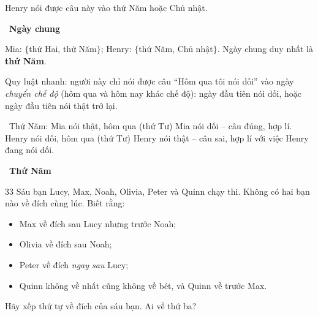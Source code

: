\documentclass[11pt]{article}
\providecommand{\AnsWord}{Đáp số}
\newenvironment{probbox}[2]{\begin{probboxT}{#1}{#2}}{\end{probboxT}}
\newcommand{\ans}[1]{\par\smallskip{\bfseries\color{tmGreen!88!black}\AnsWord:}\ {\bfseries\color{AnsRed}#1}\par}
\newcommand{\step}[2]{\par\smallskip\noindent{\bfseries\color{tmBlue!85!black}\StepWord~#1.}\ {\bfseries #2}\par\nopagebreak}
\newcommand{\verify}[1]{\par\smallskip\noindent{\bfseries\color{tmGreen!80!black}\faCheckCircle\ \CheckWord}\ #1\par}
\def\AnsWord{Đáp số}
\def\StepWord{Bước}
\def\CheckWord{Thử lại:}
\begin{document}
{\begin{center}
\begin{tabular}{|l|c|c|c|c|c|c|c|}
\end{tabular}
\end{center}
Henry nói được câu này vào thứ Năm hoặc Chủ nhật.
\step{3}{Ngày chung}
Mia: $\{$thứ Hai, thứ Năm$\}$; Henry: $\{$thứ Năm, Chủ nhật$\}$. Ngày chung duy nhất là \textbf{thứ Năm}.
\begin{tipbox}Quy luật nhanh: người này chỉ nói được câu ``Hôm qua tôi nói dối'' vào ngày \emph{chuyển chế độ}
(hôm qua và hôm nay khác chế độ): ngày đầu tiên nói dối, hoặc ngày đầu tiên nói thật trở lại.\end{tipbox}
\verify{Thứ Năm: Mia nói thật, hôm qua (thứ Tư) Mia nói dối -- câu đúng, hợp lí. Henry nói dối, hôm qua (thứ Tư) Henry nói thật --
câu sai, hợp lí với việc Henry đang nói dối.}
\ans{Thứ Năm}
}

\begin{probbox}{33}{\relax}
Sáu bạn Lucy, Max, Noah, Olivia, Peter và Quinn chạy thi. Không có hai bạn nào về đích cùng lúc. Biết rằng:
\begin{itemize}[leftmargin=1.4em,itemsep=0pt,topsep=2pt]
  \item Max về đích sau Lucy nhưng trước Noah;
  \item Olivia về đích sau Noah;
  \item Peter về đích \emph{ngay sau} Lucy;
  \item Quinn không về nhất cũng không về bét, và Quinn về trước Max.
\end{itemize}
Hãy xếp thứ tự về đích của sáu bạn. Ai về thứ ba?
\end{probbox}
\end{document}
